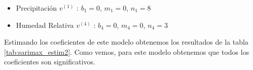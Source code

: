 \documentclass[12pt,oneside]{book}\usepackage[]{graphicx}\usepackage[]{color}
\newenvironment{knitrout}{}{} %
\theoremstyle{definition} %
\begin{document}
\begin{itemize}
\item Precipitación $v^{(1)}$ : $b_1= 0$, $m_1=0$, $n_1=8$
\item Humedad Relativa $v^{(4)}$ : $b_4= 0$, $m_4=0$, $n_4=3$
\end{itemize}


Estimando los coeficientes de este modelo obtenemos los resultados de la tabla \ref{tab:sarimax_estim2}. Como vemos, para este modelo obtenemos que todos los coeficientes son significativos. 


\begin{knitrout}
\color{fgcolor}\begin{table}


\end{table}
\end{knitrout}
\end{document}
